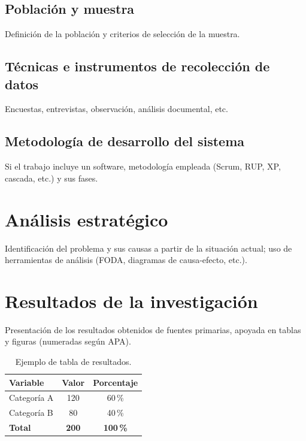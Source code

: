 \subsection{Población y muestra}
Definición de la población y criterios de selección de la muestra.

\subsection{Técnicas e instrumentos de recolección de datos}
Encuestas, entrevistas, observación, análisis documental, etc.

\subsection{Metodología de desarrollo del sistema}
Si el trabajo incluye un software, metodología empleada (Scrum, RUP, XP,
cascada, etc.) y sus fases.

\section{Análisis estratégico}

Identificación del problema y sus causas a partir de la situación actual; uso de
herramientas de análisis (FODA, diagramas de causa-efecto, etc.).

\section{Resultados de la investigación}

Presentación de los resultados obtenidos de fuentes primarias, apoyada en tablas
y figuras (numeradas según APA).


\begin{table}[H]
  \centering
  \caption{Ejemplo de tabla de resultados.}
  \label{tab:ejemplo}
  \begin{tabular}{lcc}
    \toprule
    \textbf{Variable} & \textbf{Valor} & \textbf{Porcentaje} \\
    \midrule
    Categoría A & 120 & 60\,\% \\
    Categoría B & 80  & 40\,\% \\
    \midrule
    \textbf{Total} & \textbf{200} & \textbf{100\,\%} \\
    \bottomrule
  \end{tabular}
\end{table}

